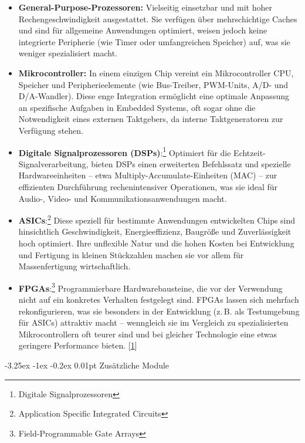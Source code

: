 \documentclass[
    headings=optiontotocandhead,%
    twoside,
    numbers=noenddot,%
    12pt, %
    titlepage, %
    parskip=full, %
    listof=leveldown, 
    numbers=noenddot, %
    a4paper,DIV=14,
    BCOR=15mm,
]{scrbook}
\makeatletter
\renewcommand\paragraph{\@startsection{paragraph}{4}{\z@}%
    {-3.25ex \@plus -1ex \@minus -0.2ex}%
    {0.01pt}%
    {\raggedsection\normalfont\sectfont\nobreak\size@paragraph}%
  }
\makeatother
\begin{document}
\begin{itemize}
\item
  \textbf{General-Purpose-Prozessoren:} Vielseitig einsetzbar und mit
  hoher Rechengeschwindigkeit ausgestattet. Sie verfügen über
  mehrschichtige Caches und sind für allgemeine Anwendungen optimiert,
  weisen jedoch keine integrierte Peripherie (wie Timer oder
  umfangreichen Speicher) auf, was sie weniger spezialisiert macht.
\item
  \textbf{Mikrocontroller:} In einem einzigen Chip vereint ein
  Mikrocontroller CPU, Speicher und Peripherieelemente (wie Bus-Treiber,
  PWM-Units, A/D- und D/A-Wandler). Diese enge Integration ermöglicht
  eine optimale Anpassung an spezifische Aufgaben in Embedded Systems,
  oft sogar ohne die Notwendigkeit eines externen Taktgebers, da interne
  Taktgeneratoren zur Verfügung stehen.
\item
  \textbf{Digitale Signalprozessoren (DSPs)}:\footnote{Digitale
    Signalprozessoren} Optimiert für die Echtzeit-Signalverarbeitung,
  bieten DSPs einen erweiterten Befehlssatz und spezielle
  Hardwareeinheiten -- etwa Multiply-Accumulate-Einheiten (MAC) -- zur
  effizienten Durchführung rechenintensiver Operationen, was sie ideal
  für Audio-, Video- und Kommunikationsanwendungen macht.
\item
  \textbf{ASICs}:\footnote{Application Specific Integrated Circuits}
  Diese speziell für bestimmte Anwendungen entwickelten Chips sind
  hinsichtlich Geschwindigkeit, Energieeffizienz, Baugröße und
  Zuverlässigkeit hoch optimiert. Ihre unflexible Natur und die hohen
  Kosten bei Entwicklung und Fertigung in kleinen Stückzahlen machen sie
  vor allem für Massenfertigung wirtschaftlich.
\item
  \textbf{FPGAs}:\footnote{Field-Programmable Gate Arrays}
  Programmierbare Hardwarebausteine, die vor der Verwendung nicht auf
  ein konkretes Verhalten festgelegt sind. FPGAs lassen sich mehrfach
  rekonfigurieren, was sie besonders in der Entwicklung (z.\,B. als
  Testumgebung für ASICs) attraktiv macht -- wenngleich sie im Vergleich
  zu spezialisierten Mikrocontrollern oft teurer sind und bei gleicher
  Technologie eine etwas geringere Performance bieten.
  {[}\protect\hyperlink{ref-EmbeddedSystems}{1}{]}
\end{itemize}

\hypertarget{zusuxe4tzliche-module}{%
\paragraph{Zusätzliche Module}\label{zusuxe4tzliche-module}}
\end{document}
